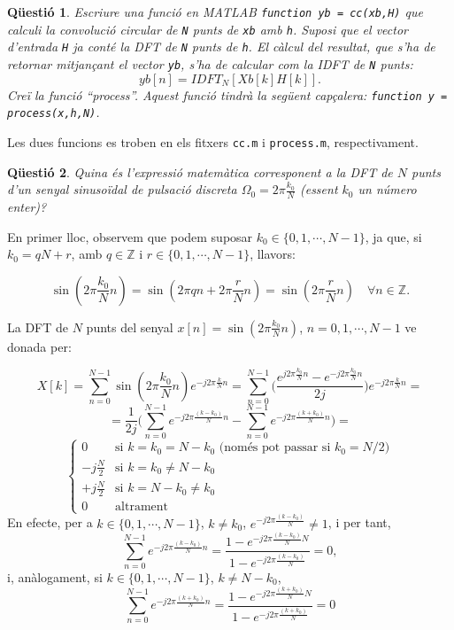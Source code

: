 \documentclass[11pt,a4]{article}
\numberwithin{equation}{section}
\theoremstyle{thmstyle}
\theoremstyle{thmstyle}
\theoremstyle{thmstyle}
\theoremstyle{thmstyle}
\theoremstyle{thmstyle}
\theoremstyle{thmstyle}
\newtheorem{question}{Qüestió}
\begin{document}
\begin{question}
Escriure una funció en MATLAB {\tt function yb = cc(xb,H)} que calculi la convolució circular de {\tt N} punts de {\tt xb} amb {\tt h}. Suposi que el vector d'entrada {\tt H} ja conté la DFT de {\tt N} punts de {\tt h}. El càlcul del resultat, que s'ha de retornar mitjançant el vector {\tt yb}, s'ha de calcular com la IDFT de {\tt N} punts:
$$
yb[n] = IDFT_N [Xb[k]H[k]].
$$
Creï la funció ``process''. Aquest funció tindrà la següent capçalera: {\tt function y = process(x,h,N)}.
\end{question}

Les dues funcions es troben en els fitxers {\tt cc.m} i {\tt process.m}, respectivament.

\begin{question}
Quina és l'expressió matemàtica corresponent a la DFT de $N$ punts d'un senyal sinusoïdal de pulsació discreta $\Omega_0=2\pi\frac{k_0}{N}$ (essent $k_0$ un número enter)?
\end{question}

En primer lloc, observem que podem suposar $k_0\in\lbrace 0,1,\cdots,N-1\rbrace$, ja que, si $k_0=qN+r$, amb $q\in\mathbb{Z}$ i $r\in\lbrace 0,1,\cdots,N-1\rbrace$, llavors:

$$
\sin(2\pi\frac{k_0}{N}n) = \sin(2\pi qn + 2\pi\frac{r}{N}n) = \sin(2\pi\frac{r}{N}n) \quad \forall n\in\mathbb{Z}.
$$

La DFT de $N$ punts del senyal $x[n]=\sin(2\pi\frac{k_0}{N}n)$, $n=0,1,\cdots, N-1$ ve donada per:

$$X[k] = \sum_{n=0}^{N-1}\sin(2\pi\frac{k_0}{N}n)e^{-j2\pi\frac{k}{N}n} = \sum_{n=0}^{N-1}\Big(\frac{e^{j2\pi\frac{k_0}{N}n}-e^{-j2\pi\frac{k_0}{N}n}}{2j}\Big)e^{-j2\pi\frac{k}{N}n}=
$$
$$
=\frac{1}{2j}\Big(\sum_{n=0}^{N-1}e^{-j2\pi\frac{(k-k_0)}{N}n}-\sum_{n=0}^{N-1}e^{-j2\pi\frac{(k+k_0)}{N}n}\Big)=
$$
$$
\begin{cases}
0                 & \text{si $k=k_0=N-k_0$ (només pot passar si $k_0 = N/2$)} \\
-j\frac{N}{2}     & \text{si $k=k_0\neq N-k_0$} \\
+j\frac{N}{2}     & \text{si $k=N-k_0\neq k_0$} \\
0                 & \text{altrament}
\end{cases}
$$
En efecte, per a $k\in\lbrace 0,1,\cdots,N-1\rbrace$, $k\neq k_0$, $e^{-j2\pi\frac{(k-k_0)}{N}}\neq 1$, i per tant,
$$
\sum_{n=0}^{N-1}e^{-j2\pi\frac{(k-k_0)}{N}n}=\frac{1-e^{-j2\pi\frac{(k-k_0)}{N}N}}{1-e^{-j2\pi\frac{(k-k_0)}{N}}} = 0,
$$
i, anàlogament, si $k\in\lbrace 0,1,\cdots,N-1\rbrace$, $k\neq N-k_0$,
$$
\sum_{n=0}^{N-1}e^{-j2\pi\frac{(k+k_0)}{N}n}=\frac{1-e^{-j2\pi\frac{(k+k_0)}{N}N}}{1-e^{-j2\pi\frac{(k+k_0)}{N}}} = 0
$$
\end{document}
